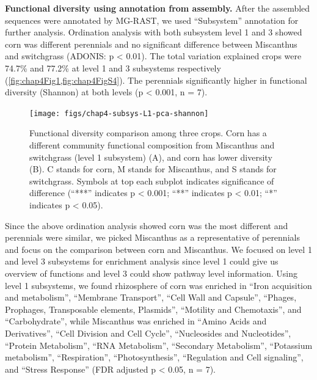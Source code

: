 \documentclass[]{msu-thesis}
\begin{document}
\textbf{Functional diversity using annotation from assembly. }
After the assembled sequences were annotated by MG-RAST, we used ``Subsystem'' annotation for further analysis. Ordination analysis with both subsystem level 1 and 3 showed corn was different perennials and no significant difference between Miscanthus and switchgrass (ADONIS: p < 0.01). The total variation explained crops were 74.7\% and 77.2\% at level 1 and 3 subsystems respectively (\cref{fig:chap4Fig1,fig:chap4FigS4}). The perennials significantly higher in functional diversity (Shannon) at both levels (p < 0.001, n = 7).

\begin{figure}[tbph!]
  \centering
  \texttt{[image: figs/chap4-subsys-L1-pca-shannon]}
  \caption[Functional diversity of three crops using subsystem level 1 ]{Functional diversity comparison among three crops. Corn has a different community functional composition from Miscanthus and switchgrass (level 1 subsystem) (A), and corn has lower diversity (B). C stands for corn, M stands for Miscanthus, and S stands for switchgrass. Symbols at top each subplot indicates significance of difference (``***'' indicates p < 0.001; ``**'' indicates p < 0.01; ``*'' indicates p < 0.05).}
  \label{fig:chap4FigS4}
\end{figure}


Since the above ordination analysis showed corn was the most different and perennials were similar, we picked Miscanthus as a representative of perennials and focus on the comparison between corn and Miscanthus. We focused on level 1 and level 3 subsystems for enrichment analysis since level 1 could give us overview of functions and level 3 could show pathway level information. Using level 1 subsystems, we found rhizosphere of corn was enriched in ``Iron acquisition and metabolism'', ``Membrane Transport'', ``Cell Wall and Capsule'', ``Phages, Prophages, Transposable elements, Plasmids'', ``Motility and Chemotaxis'', and ``Carbohydrate'', while Miscanthus was enriched in ``Amino Acids and Derivatives'', ``Cell Division and Cell Cycle'', ``Nucleosides and Nucleotides'', ``Protein Metabolism'', ``RNA Metabolism'', ``Secondary Metabolism'', ``Potassium metabolism'', ``Respiration'', ``Photosynthesis'', ``Regulation and Cell signaling'', and ``Stress Response'' (FDR adjusted p < 0.05, n = 7).
\end{document}
